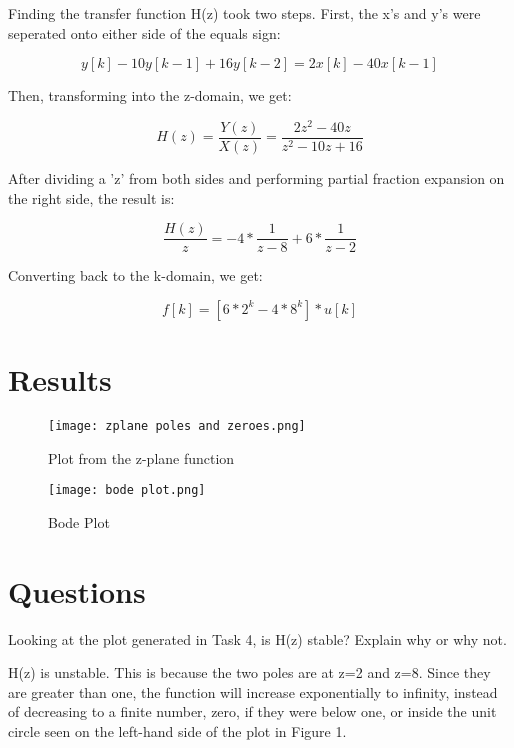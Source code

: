 \documentclass[12pt]{article}
\begin{document}
Finding the transfer function H(z) took two steps. First, the x's and y's were seperated onto either side of the equals sign:

\begin{equation}
    y[k] - 10y[k-1] + 16y[k-2] = 2x[k] - 40x[k-1]
\end{equation}

Then, transforming into the z-domain, we get:

\begin{equation}
    H(z) = \frac{Y(z)}{X(z)} = \frac{2z^2 - 40z}{z^2 - 10z + 16}
\end{equation}

After dividing a 'z' from both sides and performing partial fraction expansion on the right side, the result is:

\begin{equation}
    \frac{H(z)}{z} = -4 * \frac{1}{z-8} + 6 * \frac{1}{z-2}
\end{equation}

Converting back to the k-domain, we get:

\begin{equation}
    f[k] = [6 * 2^k - 4 * 8^k] * u[k]
\end{equation}

\section{Results}

\begin{figure}[h!]
    \centering
    \texttt{[image: zplane poles and zeroes.png]}
    \caption{Plot from the z-plane function}
\end{figure}

\begin{figure}[h!]
    \centering
    \texttt{[image: bode plot.png]}
    \caption{Bode Plot}
\end{figure}

\section{Questions}

Looking at the plot generated in Task 4, is H(z) stable? Explain why or why not.

H(z) is unstable. This is because the two poles are at z=2 and z=8. Since they are greater than one, the function will increase exponentially to infinity, instead of decreasing to a finite number, zero, if they were below one, or inside the unit circle seen on the left-hand side of the plot in Figure 1.
\end{document}
